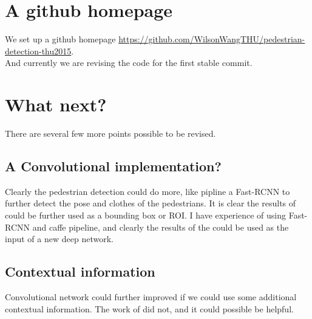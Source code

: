 \documentclass[conference]{IEEEtran}
\begin{document}
\section{A github homepage}
We set up a github homepage \url{https://github.com/WilsonWangTHU/pedestrian-detection-thu2015}.\\
\indent And currently we are revising the code for the first stable commit.
\section{What next?}
There are several few more points possible to be revised.
\subsection{A Convolutional implementation?}
Clearly the pedestrian detection could do more, like pipline a Fast-RCNN to further detect the pose and clothes of the pedestrians.
It is clear the results of \cite{W5} could be further used as a bounding box or ROI.
I have experience of using Fast-RCNN and caffe pipeline, 
and clearly the results of the \cite{W5} could be used as the input of a new deep network.
\subsection{Contextual information}
Convolutional network could further improved if we could use some additional contextual information.
The work of \cite{W5} did not, and it could possible be helpful.


\end{document}
